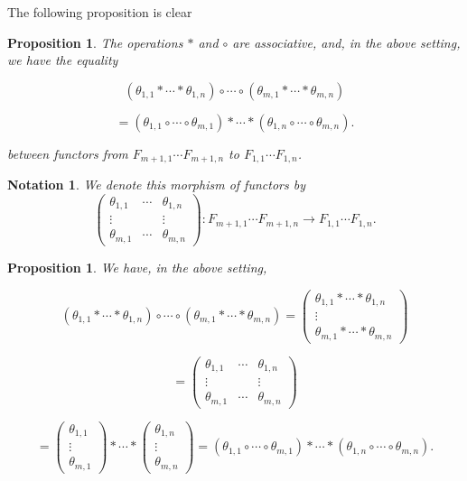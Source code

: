 \documentclass[12pt]{article}
\newtheorem{prop}[thm]{Proposition}
\newtheorem{nota}[thm]{Notation}
\theoremstyle{remark}
\theoremstyle{definition}
\newcommand{\nn}{\noindent}
\begin{document}
The following proposition is clear 

\begin{prop}
The operations $*$ and $\circ$ are associative, and, in the above setting, we have the equality 

$$
(\theta_{1,1}*\cdots*\theta_{1,n})\circ\cdots\circ(\theta_{m,1}*\cdots*\theta_{m,n})
$$ 

$$
=(\theta_{1,1}\circ\cdots\circ\theta_{m,1})*\cdots*(\theta_{1,n}\circ\cdots\circ\theta_{m,n}).
$$

\nn between functors from $F_{m+1,1}\cdots F_{m+1,n}$ to $F_{1,1}\cdots F_{1,n}$.
\end{prop}

\begin{nota}\label{nmat} 
We denote this morphism of functors by
$$
\begin{pmatrix}
\theta_{1,1}&\cdots&\theta_{1,n}\\
\vdots&&\vdots\\ 
\theta_{m,1}&\cdots&\theta_{m,n}
\end{pmatrix}:F_{m+1,1}\cdots F_{m+1,n}\to F_{1,1}\cdots F_{1,n}.
$$ 
\end{nota}

\begin{prop}\label{pil1}
We have, in the above setting,

$$
(\theta_{1,1}*\cdots*\theta_{1,n})\circ\cdots\circ(\theta_{m,1}*\cdots*\theta_{m,n})
=\begin{pmatrix}
\theta_{1,1}*\cdots*\theta_{1,n}\\
\vdots\\ 
\theta_{m,1}*\cdots*\theta_{m,n}
\end{pmatrix}
$$ 

$$
=\begin{pmatrix}
\theta_{1,1}&\cdots&\theta_{1,n}\\
\vdots&&\vdots\\ 
\theta_{m,1}&\cdots&\theta_{m,n}
\end{pmatrix}
$$

$$
=\begin{pmatrix}\theta_{1,1}\\ \vdots\\ \theta_{m,1}\end{pmatrix}*\cdots*
\begin{pmatrix}\theta_{1,n}\\ \vdots\\ \theta_{m,n}\end{pmatrix}
=(\theta_{1,1}\circ\cdots\circ\theta_{m,1})*\cdots*(\theta_{1,n}\circ\cdots\circ\theta_{m,n}).
$$
\end{prop}
\end{document}
